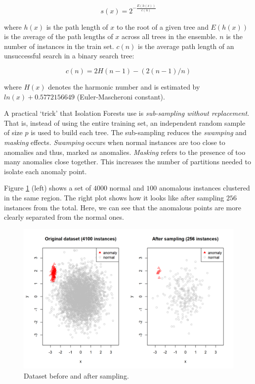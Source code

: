 \documentclass[
  11pt,
]{krantz}
\begin{document}
\begin{equation}
  s(x) = 2^{-\frac{E(h(x))}{c(n)}}
  \label{eq:anomalyScore}
\end{equation}

where \(h(x)\) is the path length of \(x\) to the root of a given tree and \(E(h(x))\) is the average of the path lengths of \(x\) across all trees in the ensemble. \(n\) is the number of instances in the train set. \(c(n)\) is the average path length of an unsuccessful search in a binary search tree:

\begin{equation}
  c(n) = 2H(n-1) - (2(n-1)/n)
  \label{eq:avgpathlength}
\end{equation}

where \(H(x)\) denotes the harmonic number and is estimated by \(ln(x) + 0.5772156649\) (Euler-Mascheroni constant).

A practical `trick' that Isolation Forests use is \emph{sub-sampling without replacement}. That is, instead of using the entire training set, an independent random sample of size \(p\) is used to build each tree. The sub-sampling reduces the \emph{swamping} and \emph{masking} effects. \emph{Swamping} occurs when normal instances are too close to anomalies and thus, marked as anomalies. \emph{Masking} refers to the presence of too many anomalies close together. This increases the number of partitions needed to isolate each anomaly point.

Figure \ref{fig:samplingInstances} (left) shows a set of \(4000\) normal and \(100\) anomalous instances clustered in the same region. The right plot shows how it looks like after sampling \(256\) instances from the total. Here, we can see that the anomalous points are more clearly separated from the normal ones.

\begin{figure}

{\centering \includegraphics[width=1\linewidth]{images/sampling_instances} 

}

\caption{Dataset before and after sampling.}\label{fig:samplingInstances}
\end{figure}
\end{document}

